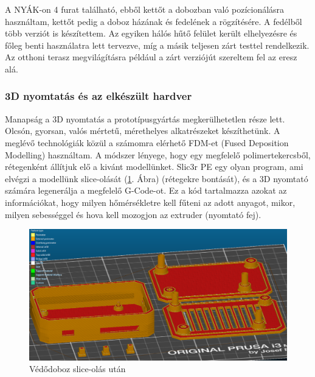 \documentclass[../main.tex]{subfiles}
\begin{document}
            A NYÁK-on 4 furat található, ebből kettőt a dobozban való pozícionálásra használtam, kettőt pedig a doboz házának és fedelének a rögzítésére. A fedélből több verziót is készítettem. Az egyiken hálós hűtő felület került elhelyezésre és főleg benti használatra lett tervezve, míg a másik teljesen zárt testtel rendelkezik. Az otthoni terasz megvilágításra például a zárt verziójút szereltem fel az eresz alá. 
            
        
        \subsubsection{3D nyomtatás és az elkészült hardver}
            Manapság a 3D nyomtatás a prototípusgyártás megkerülhetetlen része lett. Olcsón, gyorsan, valós mértetű, mérethelyes alkatrészeket készíthetünk. A meglévő technológiák közül a számomra elérhető FDM-et (Fused Deposition Modelling) használtam. A módszer lényege, hogy egy megfelelő polimertekercsből, rétegenként állítjuk elő a kivánt modellünket. Slic3r PE egy olyan program, ami elvégzi a modellünk slice-olását (\ref{fig:ledstrip_case_slice}. Ábra) (rétegekre bontását), és a 3D nyomtató számára legenerálja a megfelelő G-Code-ot. Ez a kód tartalmazza azokat az információkat, hogy milyen hőmérsékletre kell fűteni az adott anyagot, mikor, milyen sebességgel és hova kell mozogjon az extruder (nyomtató fej). 
            
            \begin{figure}[h!]
                \centering
                    \includegraphics[width=13.5cm]{resources/pcb_res/slic3r_ledstrip_case.png}
                    \caption{Védődoboz slice-olás után}
                    \label{fig:ledstrip_case_slice}
            \end{figure} 
            
\end{document}
